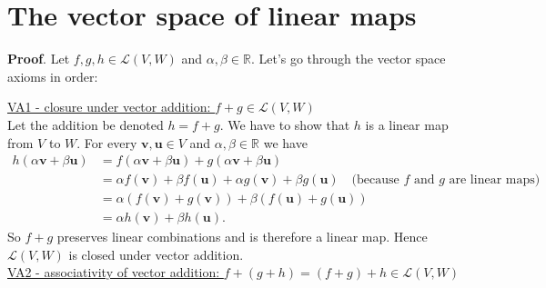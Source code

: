 \section{The vector space of linear maps}



\noindent \textbf{Proof}. Let $f,g,h\in \mathcal{L}(V,W)$ and $\alpha,\beta\in\mathbb{R}$. Let's go through the vector space axioms in order:

\noindent \underline{VA1 - closure under vector addition: $f+g\in \mathcal{L}(V,W)$} \\
\noindent Let the addition be denoted $h = f+g$. We have to show that $h$ is a linear map from $V$ to $W$. For every $\mathbf{v},\mathbf{u}\in V$ and $\alpha,\beta\in\mathbb{R}$ we have
\begin{align*}
h(\alpha\mathbf{v} + \beta\mathbf{u}) &= f(\alpha\mathbf{v} + \beta\mathbf{u}) + g(\alpha\mathbf{v} + \beta\mathbf{u}) \\
%
&= \alpha f(\mathbf{v}) + \beta f (\mathbf{u}) + \alpha g(\mathbf{v}) + \beta g(\mathbf{u}) \quad \text{(because $f$ and $g$ are linear maps)}\\
%
&= \alpha \left( f(\mathbf{v}) + g(\mathbf{v})\right)  + \beta\left( f (\mathbf{u})+ g(\mathbf{u})\right) \\
%
&= \alpha h(\mathbf{v}) + \beta h(\mathbf{u}).
\end{align*}
So $f+g$ preserves linear combinations and is therefore a linear map. Hence $\mathcal{L}(V,W)$ is closed under vector addition. \\


\noindent \underline{VA2 - associativity of vector addition: $f+(g+h) = (f+g)+h \in \mathcal{L}(V,W)$}

